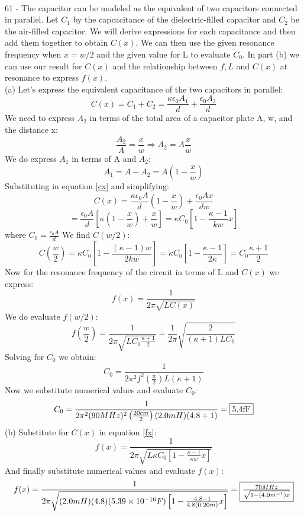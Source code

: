 \documentclass{report}
\begin{document}
\paragraph{}
61 - The capacitor can be modeled as the equivalent of two capacitors connected in parallel. Let $C_1$ by the capcacitance of the dielectric-filled capacitor and $C_2$ be the air-filled capacitor. We will derive expressions for each capacitance and then add them together to obtain $C(x)$. We can then use the given resonance frequency when $x = w / 2$ and the given value for L to evaluate $C_0$. In part (b) we can use our result for $C(x)$ and the relationship between $f, L$ and $C(x)$ at resonance to express $f(x)$.\\
(a) Let's express the equivalent capacitance of the two capacitors in parallel:
\begin{equation}\label{cx}
  C(x) = C_1 + C_2 = \frac{\kappa \epsilon_0 A_1}{d} + \frac{\epsilon_0 A_2}{d}
\end{equation}
We need to express $A_2$ in terms of the total area of a capacitor plate A, w, and the distance x:
$$\frac{A_2}{A} = \frac{x}{w} \Rightarrow A_2 = A \frac{x}{w}$$
We do express $A_1$ in terms of A and $A_2$:
$$A_1 = A - A_2 = A \left( 1 - \frac{x}{w} \right)$$
Substituting in equation \ref{cx} and simplifying:
$$C(x) = \frac{\kappa \epsilon_0 A}{d}\left( 1 - \frac{x}{w} \right) + \frac{\epsilon_0 A x}{d w}$$
$$= \frac{\epsilon_0 A}{d} \left[ \kappa \left( 1 - \frac{x}{w} \right) + \frac{x}{w} \right] = \kappa C_0 \left[ 1 - \frac{\kappa - 1}{kw} x \right]$$
where $C_0 = \frac{\epsilon_0 A}{d}$
We find $C(w / 2)$:
$$C \left( \frac{w}{2} \right) = \kappa C_0 \left[ 1- \frac{(\kappa - 1)w}{2kw} \right] = \kappa C_0 \left[ 1 - \frac{\kappa - 1}{2\kappa} \right] = C_0 \frac{\kappa + 1}{2}$$
Now for the resonance frequency of the circuit in terms of L and $C(x)$ we express:
\begin{equation}\label{fx}
  f(x) = \frac{1}{2 \pi \sqrt{LC(x)}}
\end{equation}
We do evaluate $f(w / 2)$:
$$f \left( \frac{w}{2} \right) = \frac{1}{2 \pi \sqrt{LC_0 \frac{\kappa + 1}{2}}} = \frac{1}{2 \pi} \sqrt{\frac{2}{(\kappa + 1)LC_0}}$$
Solving for $C_0$ we obtain:
$$C_0 = \frac{1}{2 \pi^2 f^2 \left( \frac{w}{2} \right)L(\kappa + 1)}$$
Now we substitute numerical values and evaluate $C_0$:
$$C_0 = \frac{1}{2 \pi^2 (90MHz)^2 \left( \frac{20cm}{2} \right)(2.0mH)(4.8 + 1)} = \fbox{5.4fF}$$
(b) Substitute for $C(x)$ in equation \ref{fx}:
$$f(x) = \frac{1}{2 \pi \sqrt{L\kappa C_0 \left[ 1 - \frac{\kappa - 1}{\kappa w} x \right]}}$$
And finally substitute numerical values and evaluate $f(x)$:
$$f(x) = \frac{1}{2 \pi \sqrt{(2.0mH)(4.8)(5.39 \times 10^{-16}F) \left[ 1 - \frac{4.8 - 1}{4.8(0.20m)} x \right]}} = \fbox{$\frac{70MHz}{\sqrt{1-(4.0m^{-1})x}}$}$$
\end{document}
